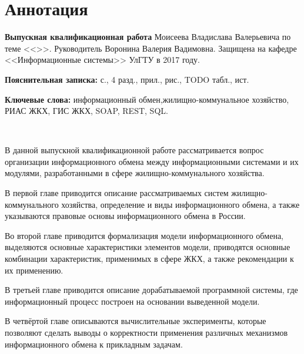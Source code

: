 
\section*{Аннотация}

\textbf{Выпускная квалификационная работа} Моисеева Владислава Валерьевича по теме <<\WorkName>>.
Руководитель Воронина Валерия Вадимовна.
Защищена на кафедре <<Информационные системы>> УлГТУ в 2017 году.

\textbf{Пояснительная записка:}  с., 4 разд.,  прил.,  рис.,  TODO табл.,  ист.

\textbf{Ключевые слова:} информационный обмен,\linebreak жилищно-коммунальное хозяйство, РИАС ЖКХ, ГИС ЖКХ, SOAP, REST, SQL.

~

В данной выпускной квалификационной работе рассматривается вопрос организации информационного обмена между информационными системами и их модулями, разработанными в сфере жилищно-коммунального хозяйства.

В первой главе приводится описание рассматриваемых систем жилищно-коммунального хозяйства, определение и виды информационного обмена, а также указываются правовые основы информационного обмена в России.

Во второй главе приводится формализация модели информационного обмена, выделяются основные характеристики элементов модели, приводятся основные комбинации характеристик, применимых в сфере ЖКХ, а также рекомендации к их применению.

В третьей главе приводится описание дорабатываемой программной системы, где информационный процесс построен на основании выведенной модели.

В четвёртой главе описываются вычислительные эксперименты, которые позволяют сделать выводы о корректности применения различных механизмов информационного обмена к прикладным задачам.

\clearpage
\newpage